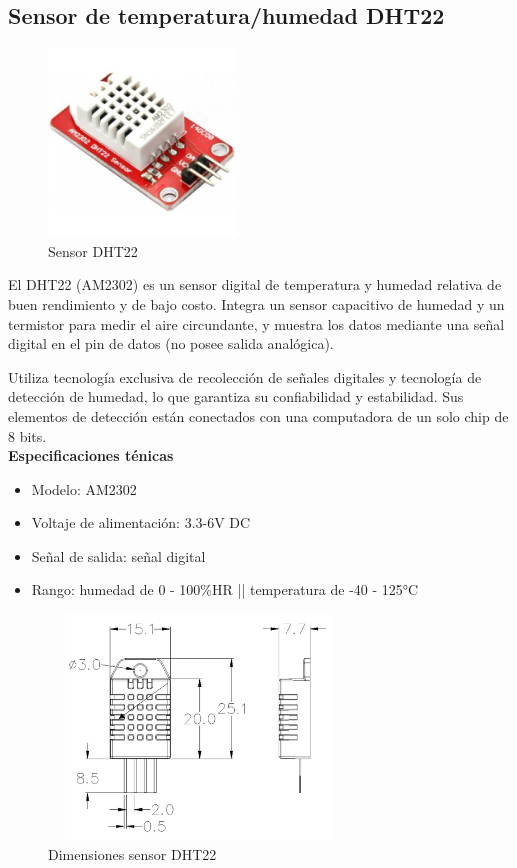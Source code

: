     \subsection{Sensor de temperatura/humedad DHT22}

    \begin{figure}[H]
      \centering
      \includegraphics[width=5cm, height=5cm]{imagenes/dht22.jpg}
      \caption{Sensor DHT22}
      \label{imag:dht22}
    \end{figure}
   
El DHT22 (AM2302) es un sensor digital de temperatura y humedad relativa de buen rendimiento y de bajo costo. Integra un sensor capacitivo de humedad y un termistor para medir el aire circundante, y muestra los datos mediante una señal digital en el pin de datos (no posee salida analógica).

Utiliza tecnología exclusiva de recolección de señales digitales y tecnología de detección de humedad, lo que garantiza su confiabilidad y estabilidad. Sus elementos de detección están conectados con una computadora de un solo chip de 8 bits.\\

\textbf{Especificaciones ténicas}

\begin{itemize}
    \item Modelo: AM2302
    \item Voltaje de alimentación: 3.3-6V DC
    \item Señal de salida: señal digital
    \item Rango: humedad de 0 - 100\%HR || temperatura de -40 - 125°C
\end{itemize}

\begin{figure}[H]
    \centering
    \includegraphics[width=8cm, height=6cm]{imagenes/dht22 dimensiones.jpg}
    \caption{Dimensiones sensor DHT22}
    \label{imag:dimensiones_dht22}
\end{figure}

